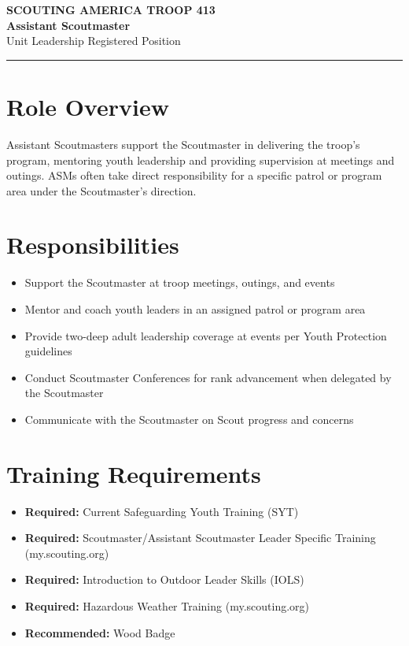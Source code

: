 \documentclass[11pt, letterpaper]{article}
\begin{document}
\begin{center}
  {\small\color{scoutgreen}\textbf{SCOUTING AMERICA \textbullet{} TROOP 413}} \\[4pt]
  {\fontsize{20pt}{24pt}\selectfont\bfseries\color{scoutgreen} Assistant Scoutmaster} \\[4pt]
  {\large\color{accent} Unit Leadership \textbullet{} Registered Position} \\[4pt]
  \textcolor{accent}{\rule{0.6\linewidth}{1pt}}
\end{center}

\vspace{0.2em}

\begin{minipage}[t]{0.48\linewidth}
\raggedright

\section{Role Overview}
Assistant Scoutmasters support the Scoutmaster in delivering the troop's program, mentoring youth leadership and providing supervision at meetings and outings. ASMs often take direct responsibility for a specific patrol or program area under the Scoutmaster's direction.

\vspace{0.3em}
\section{Responsibilities}
\begin{itemize}
  \item Support the Scoutmaster at troop meetings, outings, and events
  \item Mentor and coach youth leaders in an assigned patrol or program area
  \item Provide two-deep adult leadership coverage at events per Youth Protection guidelines
  \item Conduct Scoutmaster Conferences for rank advancement when delegated by the Scoutmaster
  \item Communicate with the Scoutmaster on Scout progress and concerns
\end{itemize}

\section{Training Requirements}
\begin{itemize}
  \item \textbf{Required:} Current Safeguarding Youth Training (SYT)
  \item \textbf{Required:} Scoutmaster/Assistant Scoutmaster Leader Specific Training (my.scouting.org)
  \item \textbf{Required:} Introduction to Outdoor Leader Skills (IOLS)
  \item \textbf{Required:} Hazardous Weather Training (my.scouting.org)
  \item \textbf{Recommended:} Wood Badge
\end{itemize}


\end{minipage}
\end{document}
